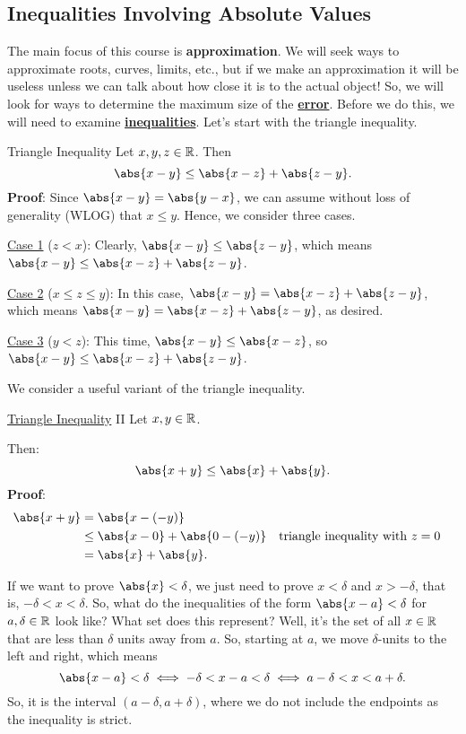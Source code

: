 \subsection{Inequalities Involving Absolute Values}
The main focus of this course is \textbf{approximation}. We will seek ways to approximate
roots, curves, limits, etc., but if we make an approximation it will be useless unless we can talk
about how close it is to the actual object! So, we will look for ways to determine the maximum
size of the \underline{\textbf{error}}. Before we do this, we will need to examine \underline{\textbf{inequalities}}.
Let's start with the triangle inequality.
\begin{Theorem}{Triangle Inequality}{}
    Let $ x,y,z\in\mathbb{R} $. Then
    \[ \abs{x-y}\le \abs{x-z}+\abs{z-y}. \]
    \tcblower{}
    \textbf{Proof}:
    Since $ \abs{x-y}=\abs{y-x} $, we can assume without loss of generality (WLOG) that $ x\le y $.
    Hence, we consider three cases.

    \underline{Case 1} ($ z<x $): Clearly, $ \abs{x-y}\le \abs{z-y} $, which means
    $ \abs{x-y}\le \abs{x-z}+\abs{z-y} $.

    \underline{Case 2} ($ x\le z\le y $): In this case, $ \abs{x-y}=\abs{x-z}+\abs{z-y} $, which means
    $ \abs{x-y}=\abs{x-z}+\abs{z-y} $, as desired.

    \underline{Case 3} ($ y<z $): This time, $ \abs{x-y}\le \abs{x-z} $, so $ \abs{x-y}\le \abs{x-z}+\abs{z-y} $.
\end{Theorem}
We consider a useful variant of the triangle inequality.
\begin{Theorem}{\href{https://proofwiki.org/wiki/Triangle_Inequality/Real_Numbers}{Triangle Inequality} II}{}
    Let $ x,y\in\mathbb{R} $.\bigskip

    Then:
    \[ \abs{x+y}\le \abs{x}+\abs{y}. \]
    \tcblower{}
    \textbf{Proof}:
    \begin{align*}
        \abs{x+y}
         & =\abs{x-(-y)}                                                           \\
         & \le \abs{x-0}+\abs{0-(-y)} &  & \text{triangle inequality with $ z=0 $} \\
         & =\abs{x}+\abs{y}.
    \end{align*}
\end{Theorem}
If we want to prove $ \abs{x}<\delta $, we just need to prove $ x<\delta $ and $ x>-\delta $, that is,
$ -\delta<x<\delta $. So, what do the inequalities of the form $ \abs{x-a}<\delta $ for
$ a,\delta\in\mathbb{R} $ look like? What set does this represent? Well, it's the set of all
$ x\in\mathbb{R} $ that are less than $ \delta $ units away from $ a $. So, starting at $ a $,
we move $ \delta $-units to the left and right, which means
\[ \abs{x-a}<\delta\iff -\delta<x-a<\delta\iff a-\delta<x<a+\delta. \]
So, it is the interval $ (a-\delta,a+\delta) $, where we do not include the endpoints as the inequality is strict.

